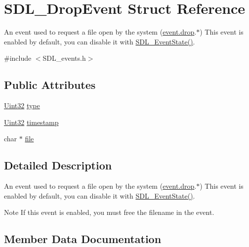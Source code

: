 \hypertarget{struct_s_d_l___drop_event}{}\section{S\+D\+L\+\_\+\+Drop\+Event Struct Reference}
\label{struct_s_d_l___drop_event}


An event used to request a file open by the system (\hyperlink{union_s_d_l___event_acff77bccbca65abbb876360a3f5209c9}{event.\+drop}.$\ast$) This event is enabled by default, you can disable it with \hyperlink{_s_d_l__events_8h_afb772893e1c46f186fa39a4defe76df3}{S\+D\+L\+\_\+\+Event\+State()}.  




{\ttfamily \#include $<$S\+D\+L\+\_\+events.\+h$>$}

\subsection*{Public Attributes}
\begin{DoxyCompactItemize}
\item 
\hyperlink{_s_d_l__stdinc_8h_add440eff171ea5f55cb00c4a9ab8672d}{Uint32} \hyperlink{struct_s_d_l___drop_event_a5ea27cfaa5f8d4940e9a69b68b3cc035}{type}
\item 
\hyperlink{_s_d_l__stdinc_8h_add440eff171ea5f55cb00c4a9ab8672d}{Uint32} \hyperlink{struct_s_d_l___drop_event_a02d2c81bb22db632a40cd0021ff751ab}{timestamp}
\item 
char $\ast$ \hyperlink{struct_s_d_l___drop_event_abc41ef4beb62e1d8b56827128b29585f}{file}
\end{DoxyCompactItemize}


\subsection{Detailed Description}
An event used to request a file open by the system (\hyperlink{union_s_d_l___event_acff77bccbca65abbb876360a3f5209c9}{event.\+drop}.$\ast$) This event is enabled by default, you can disable it with \hyperlink{_s_d_l__events_8h_afb772893e1c46f186fa39a4defe76df3}{S\+D\+L\+\_\+\+Event\+State()}. 

\begin{DoxyNote}{Note}
If this event is enabled, you must free the filename in the event. 
\end{DoxyNote}


\subsection{Member Data Documentation}
